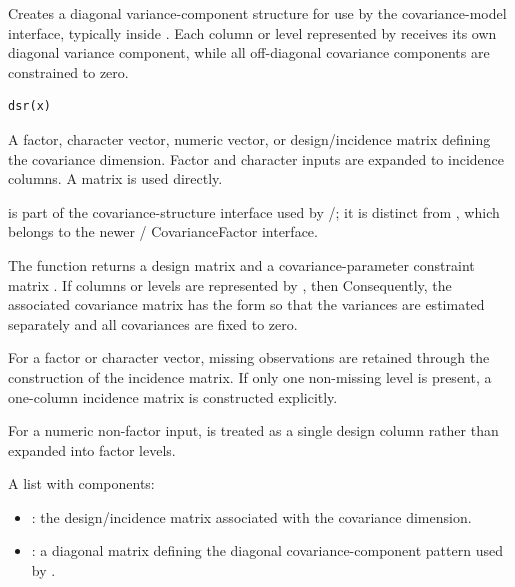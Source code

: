 \documentclass[a4paper]{book}
\begin{document}
%
\begin{Description}\relax
Creates a diagonal variance-component structure for use by the  covariance-model interface, typically inside . Each column or level represented by  receives its own diagonal variance component, while all off-diagonal covariance components are constrained to zero.
\end{Description}
%
\begin{Usage}
\begin{verbatim}
dsr(x)
\end{verbatim}
\end{Usage}
%
\begin{Arguments}
\begin{ldescription}
\item[\code{x}] 
A factor, character vector, numeric vector, or design/incidence matrix defining the covariance dimension. Factor and character inputs are expanded to incidence columns. A matrix is used directly.

\end{ldescription}
\end{Arguments}
%
\begin{Details}\relax
{} is part of the covariance-structure interface used by /; it is distinct from , which belongs to the newer / CovarianceFactor interface.

The function returns a design matrix  and a covariance-parameter constraint matrix . If  columns or levels are represented by , then
Consequently, the associated covariance matrix has the form
so that the  variances are estimated separately and all covariances are fixed to zero.

For a factor or character vector, missing observations are retained through the construction of the incidence matrix. If only one non-missing level is present, a one-column incidence matrix is constructed explicitly.

For a numeric non-factor input,  is treated as a single design column rather than expanded into factor levels.
\end{Details}
%
\begin{Value}
A list with components:
\begin{itemize}

\item{} : the design/incidence matrix associated with the covariance dimension.
\item{} : a diagonal matrix defining the diagonal covariance-component pattern used by .

\end{itemize}

\end{Value}
\end{document}
